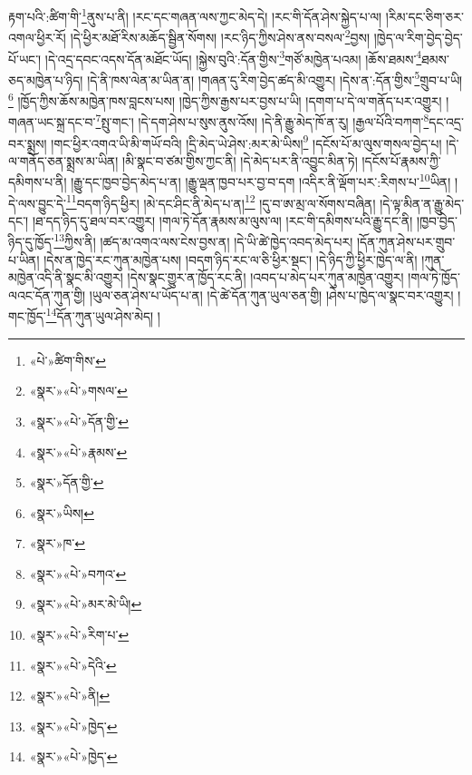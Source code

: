 རྟག་པའི་:ཚིག་གི་\footnote{«པེ་»ཚིག་གིས་}ནུས་པ་ནི། །རང་དང་གཞན་ལས་ཀྱང་མེད་དེ། །རང་གི་དོན་ཤེས་སྐྱེད་པ་ལ། །རིམ་དང་ཅིག་ཅར་འགལ་ཕྱིར་རོ། །དེ་ཕྱིར་མཐོ་རིས་མཆོད་སྦྱིན་སོགས། །རང་ཉིད་ཀྱིས་ཤེས་ནས་བསལ་\footnote{«སྣར་»«པེ་»གསལ་}བྱས། །ཁྱེད་ལ་རིག་བྱེད་བྱེད་པོ་ཡང་། །དེ་འདྲ་དབང་འདས་དོན་མཐོང་ཡོད། །སྐྱེས་བུའི་:དོན་གྱིས་\footnote{«སྣར་»«པེ་»དོན་གྱི་}གཙོ་མཁྱེན་པའམ། །ཆོས་ཐམས་\footnote{«སྣར་»«པེ་»རྣམས་}ཐམས་ཅད་མཁྱེན་པ་ཉིད། །དེ་ནི་ཁས་ལེན་མ་ཡིན་ན། །གཞན་དུ་རིག་བྱེད་ཚད་མི་འགྱུར། །དེས་ན་:དོན་གྱིས་\footnote{«སྣར་»དོན་གྱི་}གྲུབ་པ་ཡི།\footnote{«སྣར་»ཡིས།} །ཁྱོད་ཀྱིས་ཆོས་མཁྱེན་ཁས་བླངས་པས། །ཁྱེད་ཀྱིས་རྒྱས་པར་བྱས་པ་ཡི། །དགག་པ་དེ་ལ་གནོད་པར་འགྱུར། །གཞན་ཡང་སྐྲ་དང་བ་\footnote{«སྣར་»ཁ་}སྤུ་གང་། །དེ་དག་ཤེས་པ་སུས་ནུས་འོས། །དེ་ནི་རྒྱུ་མེད་ཁོ་ན་རུ། །རྒྱལ་པོའི་བཀག་\footnote{«སྣར་»«པེ་»བཀའ་}དང་འདྲ་བར་སྨྲས། །གང་ཕྱིར་འགའ་ཡི་མི་གཡོ་བའི། །དྲི་མེད་ཡེ་ཤེས་:མར་མེ་ཡིས།\footnote{«སྣར་»«པེ་»མར་མེ་ཡི།} །དངོས་པོ་མ་ལུས་གསལ་བྱེད་པ། །དེ་ལ་གནོད་ཅན་སྨྲས་མ་ཡིན། །མི་སྣང་བ་ཙམ་གྱིས་ཀྱང་ནི། །དེ་མེད་པར་ནི་འབྱུང་མིན་ཏེ། །དངོས་པོ་རྣམས་ཀྱི་དམིགས་པ་ནི། །རྒྱུ་དང་ཁྱབ་བྱེད་མེད་པ་ན། །རྒྱུ་ལྡན་ཁྱབ་པར་བྱ་བ་དག །འདིར་ནི་ལྡོག་པར་:རིགས་པ་\footnote{«སྣར་»«པེ་»རིག་པ་}ཡིན། །དེ་ལས་བྱུང་དེ་\footnote{«སྣར་»«པེ་»དེའི་}བདག་ཉིད་ཕྱིར། །མེ་དང་ཤིང་ནི་མེད་པ་ན།\footnote{«སྣར་»«པེ་»ནི།} །དུ་བ་ཨ་མྲ་ལ་སོགས་བཞིན། །དེ་ལྟ་མིན་ན་རྒྱུ་མེད་དང་། །ཐ་དད་ཉིད་དུ་ཐལ་བར་འགྱུར། །གལ་ཏེ་དོན་རྣམས་མ་ལུས་ལ། །རང་གི་དམིགས་པའི་རྒྱུ་དང་ནི། །ཁྱབ་བྱེད་ཉིད་དུ་ཁྱོད་\footnote{«སྣར་»«པེ་»ཁྱེད་}ཀྱིས་ནི། །ཚད་མ་འགའ་ལས་ངེས་བྱས་ན། །དེ་ཡི་ཚེ་ཁྱེད་འབད་མེད་པར། །དོན་ཀུན་ཤེས་པར་གྲུབ་པ་ཡིན། །དེས་ན་ཁྱེད་རང་ཀུན་མཁྱེན་པས། །བདག་ཉིད་རང་ལ་ཅི་ཕྱིར་སྡང་། །དེ་ཉིད་ཀྱི་ཕྱིར་ཁྱེད་ལ་ནི། །ཀུན་མཁྱེན་འདི་ནི་སྣང་མི་འགྱུར། །དེས་སྣང་གྱུར་ན་ཁྱོད་རང་ནི། །འབད་པ་མེད་པར་ཀུན་མཁྱེན་འགྱུར། །གལ་ཏེ་ཁྱོད་ལའང་དོན་ཀུན་གྱི། །ཡུལ་ཅན་ཤེས་པ་ཡོད་པ་ན། །དེ་ཚེ་དོན་ཀུན་ཡུལ་ཅན་གྱི། །ཤེས་པ་ཁྱེད་ལ་སྣང་བར་འགྱུར། །གང་ཁྱོད་\footnote{«སྣར་»«པེ་»ཁྱེད་}དོན་ཀུན་ཡུལ་ཤེས་མེད། །
